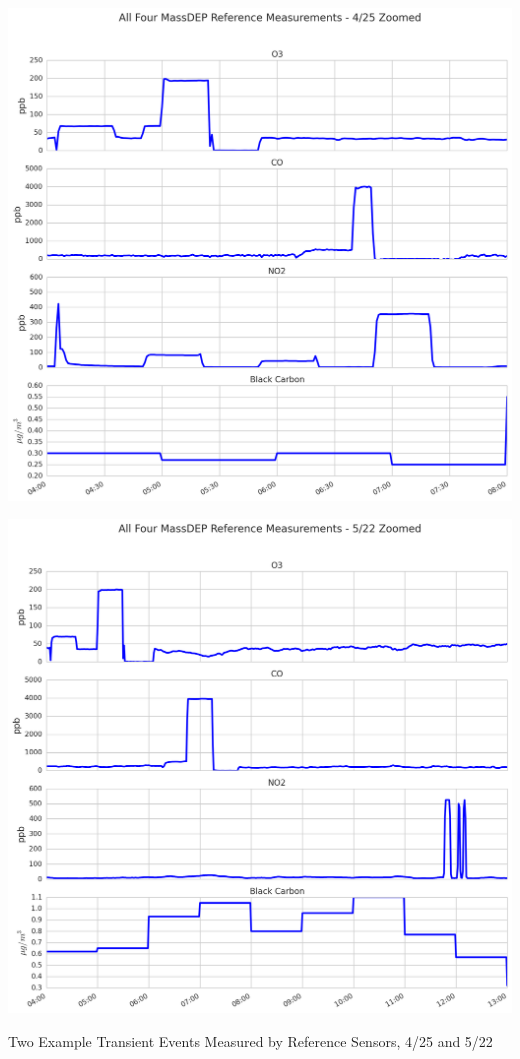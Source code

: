 \begin{marginfigure}
	\includegraphics[width=\textwidth]{figs/epa_ref_measures_zoomed2}  
	\par
	\par
 	\includegraphics[width=\textwidth]{figs/epa_ref_measures_zoomed} 
             
 	 \caption{Two Example Transient Events Measured by Reference Sensors, 4/25 and 5/22}
  	\label{fig:epa_ref_measures_zoomed}
\end{marginfigure}


